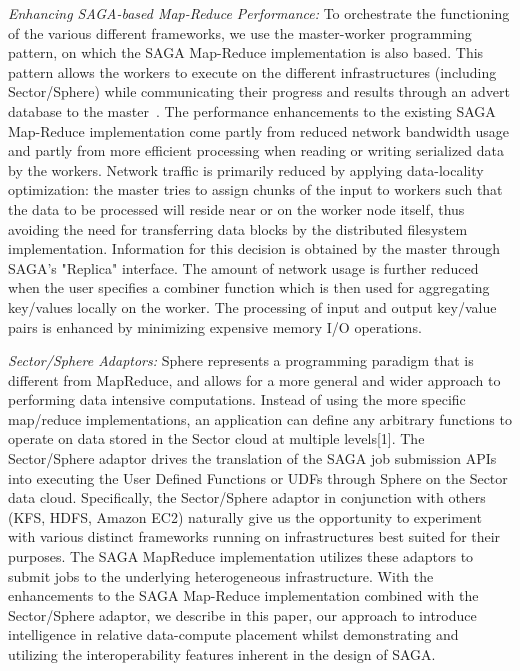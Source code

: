\documentclass[a4paper,11pt]{article}
\begin{document}
{\it Enhancing SAGA-based Map-Reduce Performance:} To orchestrate the functioning of the various different frameworks, we use the master-worker programming pattern, on which the SAGA Map-Reduce implementation is also based. This pattern allows the workers to execute on the different infrastructures (including Sector/Sphere) while communicating their progress and results through an advert database to the master~\cite{saga_ccgrid09}. The performance enhancements to the existing SAGA Map-Reduce implementation come partly from reduced network bandwidth usage and partly from more efficient processing when reading or writing serialized data by the workers. Network traffic is primarily reduced by applying data-locality optimization: the master tries to assign chunks of the input to workers such that the data to be processed will reside near or on the worker node itself, thus avoiding the need for transferring data blocks by the distributed filesystem implementation. Information for this decision is obtained by the master through SAGA's "Replica" interface. The amount of network usage is further reduced when the user specifies a combiner function which is then used for aggregating key/values locally on the worker. The processing of input and output key/value pairs is enhanced by minimizing expensive memory I/O operations.

{\it Sector/Sphere Adaptors: }Sphere represents a programming paradigm that is different from MapReduce, and allows for a more general and wider approach to performing data intensive computations. Instead of using the more specific map/reduce implementations, an application can define any arbitrary functions to operate on data stored in the Sector cloud at multiple levels[1]. The Sector/Sphere adaptor drives the translation of the SAGA job submission APIs into executing the User Defined Functions or UDFs through Sphere on the Sector data cloud.  Specifically, the Sector/Sphere adaptor in conjunction with others (KFS, HDFS, Amazon EC2) naturally give us the opportunity to experiment with various distinct frameworks running on infrastructures best suited for their purposes. The SAGA MapReduce implementation utilizes these adaptors to submit jobs to the underlying heterogeneous infrastructure. With the enhancements to the SAGA Map-Reduce implementation combined with the Sector/Sphere adaptor, we describe in this paper, our approach to introduce intelligence in relative data-compute placement whilst demonstrating and utilizing the interoperability features inherent in the design of SAGA. 
\end{document}
